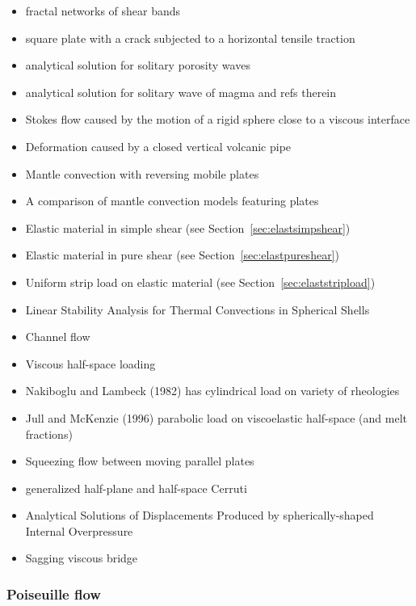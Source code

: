 \begin{itemize}
\item fractal networks of  shear bands \cite{pohe94}
\item square plate with a crack subjected to a horizontal tensile traction \cite{litu02}
\item analytical solution for solitary porosity waves \cite{copo15}
\item analytical solution for solitary wave of magma \cite{dahe16} and refs therein
\item Stokes flow caused by the motion of a rigid sphere close to a viscous interface \cite{dagr98}
\item Deformation caused by a closed vertical volcanic pipe \cite{boda99}
\item Mantle convection with reversing mobile plates \cite{kogk05}
\item A comparison of mantle convection models featuring plates \cite{stlh14}
\item Elastic material in simple shear (see Section~\ref{sec:elastsimpshear})
\item Elastic material in pure shear (see Section~\ref{sec:elastpureshear})
\item Uniform strip load on elastic material (see Section~\ref{sec:elaststripload})
\item Linear Stability Analysis for Thermal Convections in Spherical Shells \cite{yuwa19}
\item Channel flow \cite{manc08}
\item Viscous half-space loading \cite{hask35}
\item Nakiboglu and Lambeck (1982) has cylindrical load on variety of rheologies \cite{nala82}
\item Jull and McKenzie (1996) \cite{jumc96} parabolic load on viscoelastic half-space (and melt fractions) 
\item Squeezing flow between moving parallel plates \cite{gugu77}
\item generalized half-plane and half-space Cerruti \cite{nowi92,zhga15}
\item Analytical Solutions of Displacements Produced by spherically-shaped Internal Overpressure \cite{gech12}
\item Sagging viscous bridge \cite{stokes98}
\end{itemize}


\subsubsection{Poiseuille flow} \label{ss:poiseuille}

